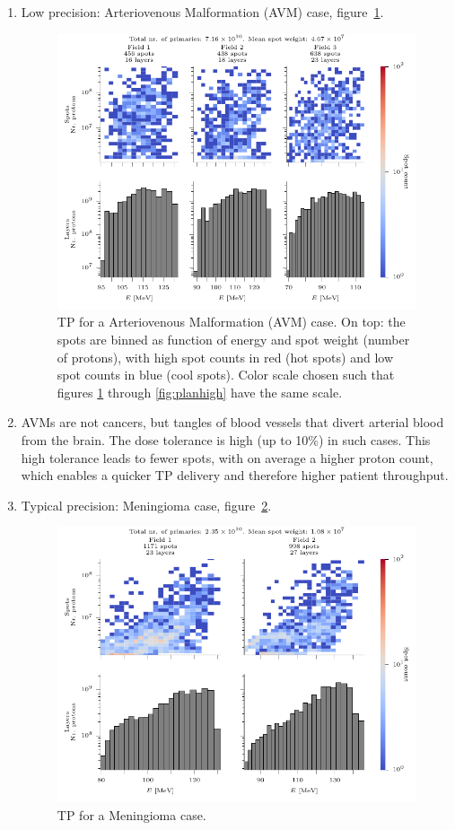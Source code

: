 \documentclass[a4paper,english]{article}
\begin{document}
\begin{enumerate}[noitemsep]
\item Low precision: Arteriovenous Malformation (AVM) case, figure~\ref{fig:planlow}.

\begin{figure}[htp]
  \centering
  \includegraphics[width=0.8\linewidth]{AVM_F1nonorm-plot}
  \caption{TP for a Arteriovenous Malformation (AVM) case. On top: the spots are binned as function of energy and spot weight (number of protons), with high spot counts in red (hot spots) and low spot counts in blue (cool spots). Color scale chosen such that figures \ref{fig:planlow} through \ref{fig:planhigh} have the same scale.}
  \label{fig:planlow}
\end{figure}

\item[] AVMs are not cancers, but tangles of blood vessels that divert arterial blood from the brain. The dose tolerance is high (up to 10\%) in such cases. This high tolerance leads to fewer spots, with on average a higher proton count, which enables a quicker TP delivery and therefore higher patient throughput.

\item Typical precision: Meningioma case, figure~\ref{fig:planmid}.

\begin{figure}[htp]
  \centering
  \includegraphics[width=0.8\linewidth]{MENINGIOMA_F1nonorm-plot}
  \caption{TP for a Meningioma case.}
  \label{fig:planmid}
\end{figure}


\end{enumerate}
\end{document}
